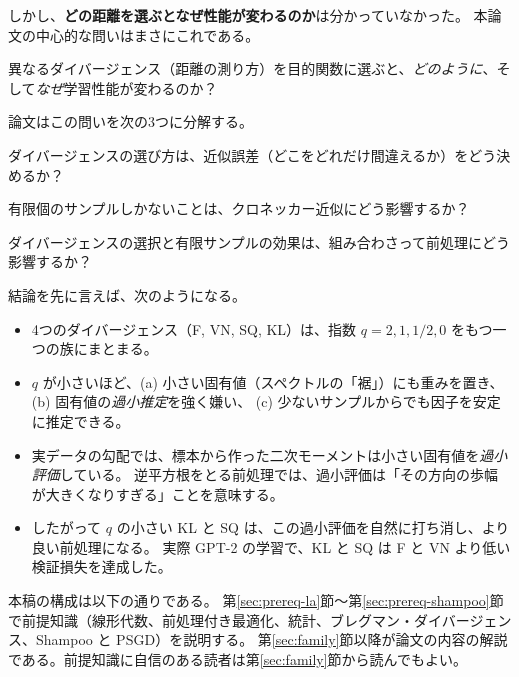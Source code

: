 \documentclass[a4paper,11pt]{ltjsarticle}
\theoremstyle{definition}
\theoremstyle{plain}
\begin{document}
しかし、\textbf{どの距離を選ぶとなぜ性能が変わるのか}は分かっていなかった。
本論文の中心的な問いはまさにこれである。

\begin{pointbox}[論文の中心的な問い]
異なるダイバージェンス（距離の測り方）を目的関数に選ぶと、\emph{どのように}、そして\emph{なぜ}学習性能が変わるのか？
\end{pointbox}

論文はこの問いを次の3つに分解する。
\begin{description}[leftmargin=3em]
  \item[(Q1)] ダイバージェンスの選び方は、近似誤差（どこをどれだけ間違えるか）をどう決めるか？
  \item[(Q2)] 有限個のサンプルしかないことは、クロネッカー近似にどう影響するか？
  \item[(Q3)] ダイバージェンスの選択と有限サンプルの効果は、組み合わさって前処理にどう影響するか？
\end{description}

結論を先に言えば、次のようになる。
\begin{itemize}
  \item 4つのダイバージェンス（F, VN, SQ, KL）は、指数 $q = 2, 1, 1/2, 0$ をもつ一つの族にまとまる。
  \item $q$ が小さいほど、(a) 小さい固有値（スペクトルの「裾」）にも重みを置き、
        (b) 固有値の\emph{過小推定}を強く嫌い、
        (c) 少ないサンプルからでも因子を安定に推定できる。
  \item 実データの勾配では、標本から作った二次モーメントは小さい固有値を\emph{過小評価}している。
        逆平方根をとる前処理では、過小評価は「その方向の歩幅が大きくなりすぎる」ことを意味する。
  \item したがって $q$ の小さい KL と SQ は、この過小評価を自然に打ち消し、より良い前処理になる。
        実際 GPT-2 の学習で、KL と SQ は F と VN より低い検証損失を達成した。
\end{itemize}

本稿の構成は以下の通りである。
第\ref{sec:prereq-la}節〜第\ref{sec:prereq-shampoo}節で前提知識（線形代数、前処理付き最適化、統計、ブレグマン・ダイバージェンス、Shampoo と PSGD）を説明する。
第\ref{sec:family}節以降が論文の内容の解説である。前提知識に自信のある読者は第\ref{sec:family}節から読んでもよい。
\end{document}
